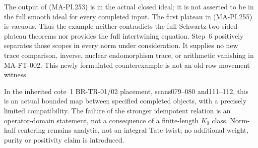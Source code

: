 The output of (MA-PI.253) is in the actual closed ideal;
it is not asserted to be in the full smooth ideal for
every completed input.  The first plateau in (MA-PI.255)
is vacuous.  Thus the example neither contradicts the
full-Schwartz two-sided plateau theorems nor provides
the full intertwining equation.  Step~6 positively
separates those scopes in every norm under consideration.
It supplies no new trace comparison, inverse, nuclear
endomorphism trace, or arithmetic vanishing in MA-FT-002.
This newly formulated counterexample is not an old-row
movement witness.

In the inherited cote~1 BR-TR-01/02 placement,
scans079--080 and111--112, this is an actual bounded
map between specified completed objects, with a precisely
limited compatibility.  The failure of the stronger
idempotent relation is an operator-domain statement,
not a consequence of a finite-length \(K_0\) class.
Norm-half centering remains analytic, not an integral
Tate twist; no additional weight, purity or positivity
claim is introduced.
